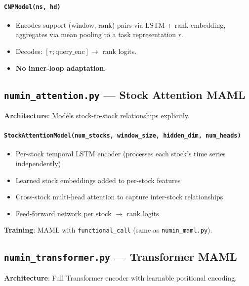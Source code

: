 \documentclass[11pt,a4paper]{article}
\begin{document}
\paragraph{\texttt{CNPModel(ns, hd)}}
\begin{itemize}[nosep]
  \item Encodes support (window, rank) pairs via LSTM + rank embedding, aggregates via mean pooling to a task representation $r$.
  \item Decodes: $[r; \text{query\_enc}] \to$ rank logits.
  \item \textbf{No inner-loop adaptation}.
\end{itemize}

\subsection{\texttt{numin\_attention.py} --- Stock Attention MAML}
\textbf{Architecture}: Models stock-to-stock relationships explicitly.

\paragraph{\texttt{StockAttentionModel(num\_stocks, window\_size, hidden\_dim, num\_heads)}}
\begin{itemize}[nosep]
  \item Per-stock temporal LSTM encoder (processes each stock's time series independently)
  \item Learned stock embeddings added to per-stock features
  \item Cross-stock multi-head attention to capture inter-stock relationships
  \item Feed-forward network per stock $\to$ rank logits
\end{itemize}
\textbf{Training}: MAML with \texttt{functional\_call} (same as \texttt{numin\_maml.py}).

\subsection{\texttt{numin\_transformer.py} --- Transformer MAML}
\textbf{Architecture}: Full Transformer encoder with learnable positional encoding.
\end{document}

